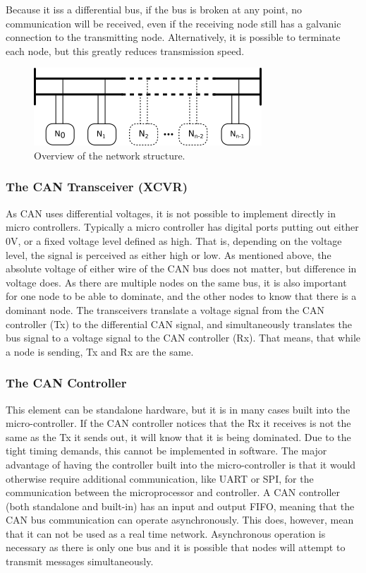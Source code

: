 Because it iss a differential bus, if the bus is broken at any point, no communication will be received, even if the receiving node still has a galvanic connection to the transmitting node.
Alternatively, it is possible to terminate each node, but this greatly reduces transmission speed.

\begin{figure}[h]
	\centering
	\includegraphics[width=.75\linewidth]{graphics/analysis_nodes}
	\caption{Overview of the network structure.}
	\label{fig:analysisnodes}
\end{figure}

\subsubsection*{The CAN Transceiver (XCVR)}
As CAN uses differential voltages, it is not possible to implement directly in micro controllers.
Typically a micro controller has digital ports putting out either $ 0 \si{\volt}$, or a fixed voltage level defined as high.
That is, depending on the voltage level, the signal is perceived as either high or low.
As mentioned above, the absolute voltage of either wire of the CAN bus does not matter, but difference in voltage does. 
As there are multiple nodes on the same bus, it is also important for one node to be able to dominate, and the other nodes to know that there is a dominant node.
The transceivers translate a voltage signal from the CAN controller (Tx) to the differential CAN signal, and simultaneously translates the bus signal to a voltage signal to the CAN controller (Rx).
That means, that while a node is sending, Tx and Rx are the same.

\subsubsection*{The CAN Controller}
This element can be standalone hardware, but it is in many cases built into the micro-controller.
If the CAN controller notices that the Rx it receives is not the same as the Tx it sends out, it will know that it is being dominated.
Due to the tight timing demands, this cannot be implemented in software.
The major advantage of having the controller built into the micro-controller is that it would otherwise require additional communication, like UART or SPI, for the communication between the microprocessor and controller.
A CAN controller (both standalone and built-in) has an input and output FIFO, meaning that the CAN bus communication can operate asynchronously.
This does, however, mean that it can not be used as a real time network.
Asynchronous operation is necessary as there is only one bus and it is possible that nodes will attempt to transmit messages simultaneously.



